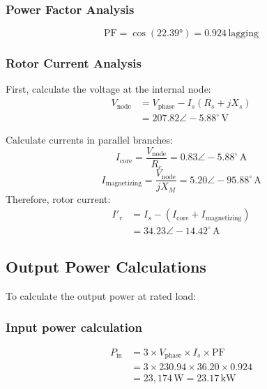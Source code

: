 \documentclass[a4paper,11pt]{IEEEtran}
\begin{document}
\subsubsection{Power Factor Analysis}
\begin{equation}
    \text{PF} = \cos(22.39°) = 0.924\,\text{lagging}
\end{equation}

\subsubsection{Rotor Current Analysis}
First, calculate the voltage at the internal node:
\begin{equation}
\begin{split}
    V_{\text{node}} &= V_{\text{phase}} - I_s(R_s + jX_s) \\
    &= 207.82\angle -5.88^\circ\,\text{V}
\end{split}
\end{equation}

Calculate currents in parallel branches:
\begin{equation}
    I_{\text{core}} = \frac{V_{\text{node}}}{R_c} = 0.83\angle -5.88^\circ\,\text{A}
\end{equation}
\begin{equation}
    I_{\text{magnetizing}} = \frac{V_{\text{node}}}{jX_M} = 5.20\angle -95.88^\circ\,\text{A}
 \end{equation}
Therefore, rotor current:
\begin{equation}
\begin{split}
    I'_r &= I_s - (I_{\text{core}} + I_{\text{magnetizing}}) \\
    &= 34.23\angle -14.42^\circ\,\text{A}
\end{split}
\end{equation}
\subsection{Output Power Calculations}
To calculate the output power at rated load:

\subsubsection{Input power calculation}
\begin{equation}
\begin{split}
    P_{\text{in}} &= 3 \times V_{\text{phase}} \times I_s \times \text{PF} \\
    &= 3 \times 230.94 \times 36.20 \times 0.924 \\
    &= 23,174\,\text{W} = 23.17\,\text{kW}
\end{split}
\end{equation}
\end{document}
